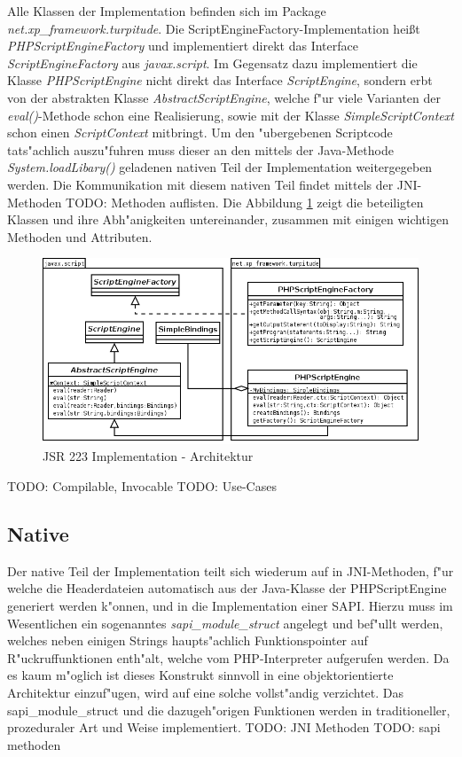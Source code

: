 Alle Klassen der Implementation befinden sich im Package \emph{net.xp\_framework.turpitude}. 
Die ScriptEngineFactory-Implementation hei\ss t \emph{PHPScriptEngineFactory} und implementiert direkt das Interface 
\emph{ScriptEngineFactory} aus \emph{javax.script}. Im Gegensatz dazu implementiert die Klasse \emph{PHPScriptEngine} nicht
direkt das Interface \emph{ScriptEngine}, sondern erbt von der abstrakten Klasse \emph{AbstractScriptEngine}, welche f"ur
viele Varianten der \emph{eval()}-Methode schon eine Realisierung, sowie mit der Klasse \emph{SimpleScriptContext} schon einen 
\emph{ScriptContext} mitbringt. Um den "ubergebenen Scriptcode tats"achlich auszu"fuhren muss dieser an den mittels der Java-Methode
\emph{System.loadLibary()} geladenen nativen Teil der Implementation weitergegeben werden. Die Kommunikation mit diesem
nativen Teil findet mittels der JNI-Methoden TODO: Methoden auflisten.
Die Abbildung \ref{fig:jsr223impl} zeigt die beteiligten Klassen und ihre Abh"anigkeiten untereinander,
zusammen mit einigen wichtigen Methoden und Attributen. 

\begin{figure}[h]
\includegraphics[width=\textwidth]{chap1/img/turpitude.png}
\caption{JSR 223 Implementation - Architektur}
\label{fig:jsr223impl}
\end{figure}

TODO: Compilable, Invocable
TODO: Use-Cases

\subsection{Native}
\label{sec:chap1:design:native}

Der native Teil der Implementation teilt sich wiederum auf in JNI-Methoden, f"ur welche die Headerdateien automatisch aus
der Java-Klasse der PHPScriptEngine generiert werden k"onnen, und in die Implementation einer SAPI. Hierzu muss im
Wesentlichen ein sogenanntes \emph{sapi\_module\_struct} angelegt und bef"ullt werden, welches neben einigen Strings
haupts"achlich Funktionspointer auf R"uckruffunktionen enth"alt, welche vom PHP-Interpreter aufgerufen werden. Da es
kaum m"oglich ist dieses Konstrukt sinnvoll in eine objektorientierte Architektur einzuf"ugen, wird auf eine solche
vollst"andig verzichtet. Das sapi\_module\_struct und die dazugeh"origen Funktionen werden in traditioneller,
prozeduraler Art und Weise implementiert.
TODO: JNI Methoden
TODO: sapi methoden






